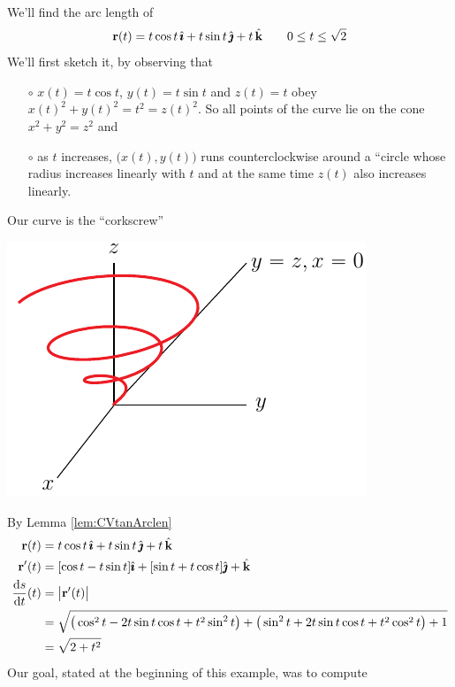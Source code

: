 \begin{eg}\label{eg:corkscrew}
We'll find the arc length of 
\begin{equation*}
\mathbf{r}(t) = t\cos t\,\hat{\pmb{\imath}} + t\sin t\,\hat{\pmb{\jmath}} +t\,\hat{\mathbf{k}}\qquad
0\le t\le\sqrt{2}
\end{equation*}
We'll first sketch it, by observing that
\begin{itemize}\itemsep1pt \parskip0pt  %
\item[$\circ$] $x(t)=t\cos t $, $y(t) =t\sin t $ and $z(t)=t$ obey
$x(t)^2+y(t)^2 = t^2 = z(t)^2$. So all points of the
curve lie on the cone $x^2+y^2=z^2$ and
\item[$\circ$] as $t$ increases, $\big(x(t),y(t)\big)$ runs 
counterclockwise around a ``circle whose radius increases linearly with $t$ 
and at the same time $z(t)$  also increases linearly.
\end{itemize}
Our curve is the ``corkscrew''
\begin{efig}
\begin{center}
     \includegraphics{corkscrew.pdf}
\end{center}
\end{efig}
By Lemma \ref{lem:CVtanArclen} 
\begin{align*}
\vr(t) &= t\cos t\,\hi + t\sin t\,\hj +t\,\hk \\
\vr'(t) &= [\cos t -t\sin t ]\hi +[\sin t+t\cos t]\hj + \hk \\
\diff{s}{t}(t)&=\big|\vr'(t)\big| \\
&= \sqrt{\big(\cos^2t-2 t\sin t\cos t +t^2\sin^2 t\big)
             +\big(\sin^2t+2 t\sin t\cos t +t^2\cos^2 t\big)+1} \\
&=\sqrt{2+t^2} 
\end{align*}
Our goal, stated at the beginning of this example, was to compute
\begin{equation*}

\end{equation*}
\end{eg}

